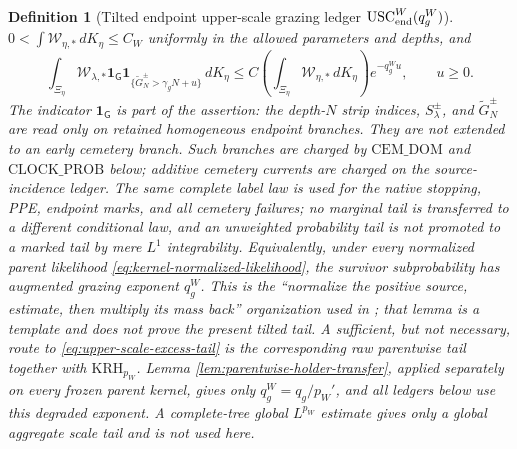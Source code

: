 \documentclass[11pt]{article}
\newtheorem{definition}[theorem]{Definition}
\newcommand{\one}{\mathbf 1}
\begin{document}
\begin{definition}[Tilted endpoint upper-scale grazing ledger
$\mathrm{USC}_{\rm end}^{W}(q_g^W)$]
$0<\int\mathscr W_{\eta,*}\,dK_\eta\le C_W$ uniformly in the allowed
parameters and depths, and
\begin{equation}
\label{eq:upper-scale-excess-tail}
 \int_{\Xi_\eta}
  \mathscr W_{\lambda,*}\one_{\mathsf G}
  \one_{\{\widetilde G_N^\pm>\gamma_gN+u\}}\,dK_\eta
 \le C\!\left(\int_{\Xi_\eta}\mathscr W_{\eta,*}\,dK_\eta\right)
 e^{-q_g^Wu},\qquad u\ge0.
\end{equation}
The indicator $\one_{\mathsf G}$ is part of the assertion: the depth-$N$
strip indices, $S_\lambda^\pm$, and $\widetilde G_N^\pm$ are read only on
retained homogeneous endpoint branches.  They are not extended to an early
cemetery branch.  Such branches are charged by $\mathrm{CEM\_DOM}$ and
$\mathrm{CLOCK\_PROB}$ below; additive cemetery currents are charged on the
source-incidence ledger.  The same complete label law is used for the
native stopping, PPE, endpoint marks, and all cemetery failures;
no marginal tail is transferred to a different conditional law, and an
unweighted probability tail is not promoted to a marked tail by mere
$L^1$ integrability.  Equivalently, under every normalized parent likelihood
\eqref{eq:kernel-normalized-likelihood}, the survivor subprobability has
augmented grazing exponent $q_g^W$.  This is the ``normalize the
positive source, estimate,
then multiply its mass back'' organization used in
\cite[Lemma~5.10]{CanestrariHoles}; that lemma is a template and does not
prove the present tilted tail.  A sufficient, but not necessary, route to
\eqref{eq:upper-scale-excess-tail} is the corresponding raw parentwise tail
together with $\mathrm{KRH}_{p_W}$.  Lemma
\ref{lem:parentwise-holder-transfer}, applied separately on every frozen
parent kernel, gives only $q_g^W=q_g/p_W'$, and all ledgers below use this
degraded exponent.  A complete-tree global $L^{p_W}$ estimate gives only a
global aggregate scale tail and is not used here.
\end{definition}
\end{document}

